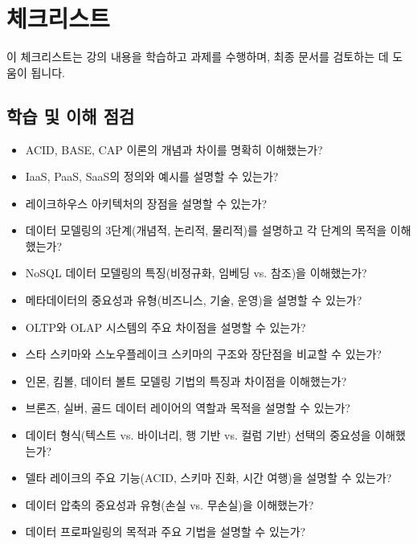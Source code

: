\documentclass[11pt,a4paper]{article}
\begin{document}
\newpage
\section{체크리스트}

이 체크리스트는 강의 내용을 학습하고 과제를 수행하며, 최종 문서를 검토하는 데 도움이 됩니다.

\subsection{학습 및 이해 점검}
\begin{itemize}
    \item [ ] ACID, BASE, CAP 이론의 개념과 차이를 명확히 이해했는가?
    \item [ ] IaaS, PaaS, SaaS의 정의와 예시를 설명할 수 있는가?
    \item [ ] 레이크하우스 아키텍처의 장점을 설명할 수 있는가?
    \item [ ] 데이터 모델링의 3단계(개념적, 논리적, 물리적)를 설명하고 각 단계의 목적을 이해했는가?
    \item [ ] NoSQL 데이터 모델링의 특징(비정규화, 임베딩 vs. 참조)을 이해했는가?
    \item [ ] 메타데이터의 중요성과 유형(비즈니스, 기술, 운영)을 설명할 수 있는가?
    \item [ ] OLTP와 OLAP 시스템의 주요 차이점을 설명할 수 있는가?
    \item [ ] 스타 스키마와 스노우플레이크 스키마의 구조와 장단점을 비교할 수 있는가?
    \item [ ] 인몬, 킴볼, 데이터 볼트 모델링 기법의 특징과 차이점을 이해했는가?
    \item [ ] 브론즈, 실버, 골드 데이터 레이어의 역할과 목적을 설명할 수 있는가?
    \item [ ] 데이터 형식(텍스트 vs. 바이너리, 행 기반 vs. 컬럼 기반) 선택의 중요성을 이해했는가?
    \item [ ] 델타 레이크의 주요 기능(ACID, 스키마 진화, 시간 여행)을 설명할 수 있는가?
    \item [ ] 데이터 압축의 중요성과 유형(손실 vs. 무손실)을 이해했는가?
    \item [ ] 데이터 프로파일링의 목적과 주요 기법을 설명할 수 있는가?
\end{itemize}
\end{document}
